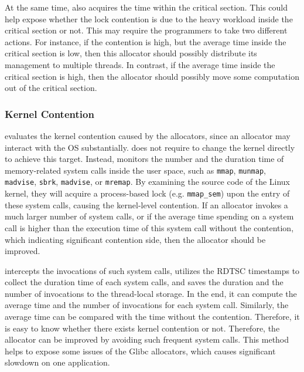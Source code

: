 At the same time, \MP{} also acquires the time within the critical section. This could help expose whether the lock contention is due to the heavy workload inside the critical section or not. This may require the programmers to take two different actions. For instance, if the contention is high, but the average time inside the critical section is low, then this allocator should possibly distribute its management to multiple threads. In contrast, if the average time inside the critical section is high, then the allocator should possibly move some computation out of the critical section. 


\subsubsection{Kernel Contention}
\MP{} evaluates the kernel contention caused by the allocators, since an allocator may interact with the OS substantially. \MP{} does not require to change the kernel directly to achieve this target. Instead, \MP{} monitors the number and the duration time of memory-related system calls inside the user space, such as \texttt{mmap}, \texttt{munmap}, \texttt{madvise}, \texttt{sbrk}, \texttt{madvise}, or \texttt{mremap}. By examining the source code of the Linux kernel, they will acquire a process-based lock (e.g. \texttt{mmap\_sem}) upon the entry of these system calls, causing the kernel-level contention. If an allocator invokes a much larger number of system calls,  or if the average time spending on a system call is higher than the execution time of this system call without the contention, which indicating significant contention side, then the allocator should be improved. 

\MP{} intercepts the invocations of such system calls, utilizes the RDTSC timestamps to collect the duration time of each system calls, and saves the duration and the number of invocations to the thread-local storage. In the end, it can compute the average time and the number of invocations for each system call. Similarly, the average time can be compared with the time without the contention. Therefore, it is easy to know whether there exists kernel contention or not. Therefore, the allocator can be improved by avoiding such frequent system calls. This method helps to expose some issues of the Glibc allocators, which causes significant slowdown on one application. 

